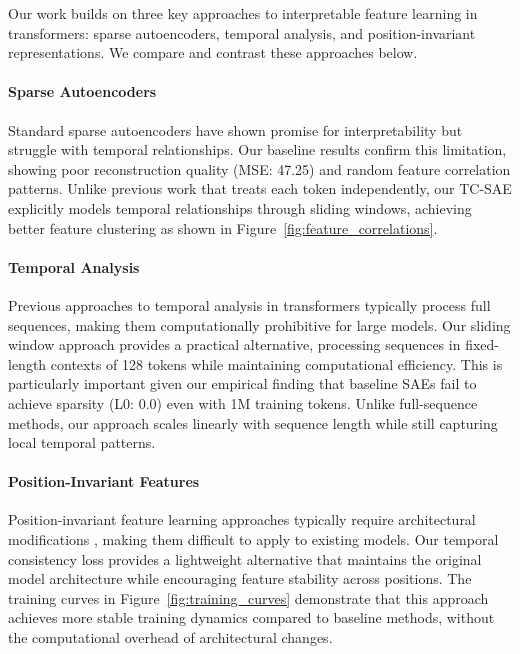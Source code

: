 \documentclass{article} %
\begin{document}
Our work builds on three key approaches to interpretable feature learning in transformers: sparse autoencoders, temporal analysis, and position-invariant representations. We compare and contrast these approaches below.

\paragraph{Sparse Autoencoders} Standard sparse autoencoders \cite{Makelov2024TowardsPE} have shown promise for interpretability but struggle with temporal relationships. Our baseline results confirm this limitation, showing poor reconstruction quality (MSE: 47.25) and random feature correlation patterns. Unlike previous work that treats each token independently, our TC-SAE explicitly models temporal relationships through sliding windows, achieving better feature clustering as shown in Figure~\ref{fig:feature_correlations}.

\paragraph{Temporal Analysis} Previous approaches to temporal analysis in transformers \cite{vaswani2017attention} typically process full sequences, making them computationally prohibitive for large models. Our sliding window approach provides a practical alternative, processing sequences in fixed-length contexts of 128 tokens while maintaining computational efficiency. This is particularly important given our empirical finding that baseline SAEs fail to achieve sparsity (L0: 0.0) even with 1M training tokens. Unlike full-sequence methods, our approach scales linearly with sequence length while still capturing local temporal patterns.

\paragraph{Position-Invariant Features} Position-invariant feature learning approaches typically require architectural modifications \cite{goodfellow2016deep}, making them difficult to apply to existing models. Our temporal consistency loss provides a lightweight alternative that maintains the original model architecture while encouraging feature stability across positions. The training curves in Figure~\ref{fig:training_curves} demonstrate that this approach achieves more stable training dynamics compared to baseline methods, without the computational overhead of architectural changes.
\end{document}
